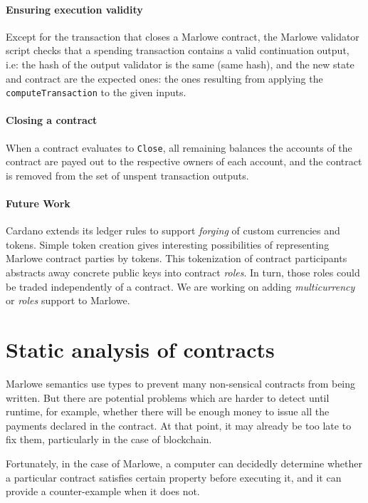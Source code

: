 \documentclass[runningheads]{llncs}
\begin{document}
\paragraph{Ensuring execution validity}

Except for the transaction that closes a Marlowe contract, the Marlowe validator script checks that a spending transaction contains a valid continuation
output, i.e: the hash of the output validator is the same (same hash), and the new state and contract are the expected ones: the ones resulting from applying the \texttt{computeTransaction} to the given inputs.

\paragraph{Closing a contract}

When a contract evaluates to \texttt{Close}, all remaining balances the accounts of the contract are payed out
to the respective owners of each account, and the contract is removed from the set of unspent transaction outputs.

\paragraph{Future Work}

Cardano extends its ledger rules to support \emph{forging} of custom currencies and tokens.%
Simple token creation gives interesting possibilities of representing Marlowe contract parties by tokens.
This tokenization of contract participants abstracts away concrete public keys into contract \emph{roles}.
In turn, those roles could be traded independently of a contract. 
We are working on adding \emph{multicurrency} or \emph{roles} support to Marlowe.

\section{Static analysis of contracts\label{sec:static}}

Marlowe semantics use types to prevent many non-sensical contracts from being written. But there are potential problems which are harder to detect until runtime, for example, whether there will be enough money to issue all the payments declared in the contract. At that point, it may already be too late to fix them, particularly in the case of blockchain.

Fortunately, in the case of Marlowe, a computer can decidedly determine whether a particular contract satisfies certain property before executing it, and it can provide a counter-example when it does not.
\end{document}

